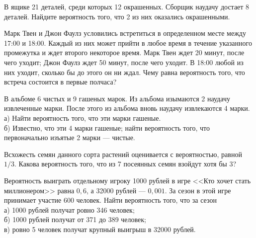 \newpage\setcounter{zad}{0}



\begin{zkrW}{20}\noindent 
	В ящике 21 деталей, среди которых 12 окрашенных. Сборщик наудачу достает 8 деталей. Найдите вероятность того, что 2 из них оказались окрашенными. 
 
\end{zkrW}

\begin{zkrW}{20}\noindent 
	Марк Твен и Джон Фаулз условились встретиться в определенном месте между 17:00 и 18:00. Каждый из них может прийти в любое время в течение указанного промежутка и ждет второго некоторое время. Марк Твен ждет 20 минут, после чего уходит; Джон Фаулз ждет 50 минут, после чего уходит. В 18:00 любой из них уходит, сколько бы до этого он ни ждал. Чему равна вероятность того, что встреча состоится в первые полчаса?
 
\end{zkrW}

\begin{zkrW}{20}\noindent 
	В альбоме 6 чистых и 9 гашеных марок. Из альбома изымаются 2 наудачу извлеченные марки. После этого из альбома вновь наудачу извлекаются 4 марки. \\ \indent а) Найти вероятность того, что эти марки гашеные. \\ \indent б) Известно, что эти 4 марки гашеные; найти вероятность того, что первоначально изъятые 2 марки --- чистые.
 
\end{zkrW}

\begin{zkrW}{20}\noindent 
	Всхожесть семян данного сорта растений оценивается с вероятностью, равной $1/3$. Какова вероятность того, что из 7 посеянных семян взойдут хотя бы 3?
 
\end{zkrW}

\begin{zkrW}{20}\noindent 
	Вероятность выиграть отдельному игроку 1000 рублей в игре <<Кто хочет стать миллионером>> равна $0{,}6$, а 32000 рублей --- $0{,}001$. За сезон в этой игре принимает участие 600 человек. Найти вероятность того, что за сезон \\ \indent а) 1000 рублей получат ровно 346 человек; \\ \indent б) 1000 рублей получат от 371 до 389 человек; \\ \indent в) ровно 5 человек получат крупный выигрыш в 32000 рублей.
 
\end{zkrW}

